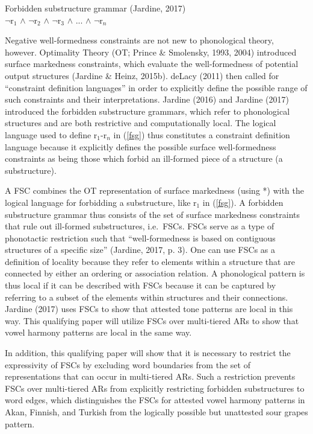 \documentclass[,doc,floatsintext]{apa6}
\theoremstyle{definition}
\theoremstyle{definition}
\theoremstyle{definition}
\theoremstyle{remark}
\begin{document}
\begin{exe}
\ex Forbidden substructure grammar (Jardine, 2017) \label{fsg} \\
$\neg$r$_1$ $\wedge$ $\neg$r$_2$ $\wedge$ $\neg$r$_3$ $\wedge$ ... $\wedge$ $\neg$r$_n$
\end{exe}

Negative well-formedness constraints are not new to phonological theory,
however. Optimality Theory (OT; Prince \& Smolensky, 1993, 2004)
introduced surface markedness constraints, which evaluate the
well-formedness of potential output structures (Jardine \& Heinz,
2015b). deLacy (2011) then called for \enquote{constraint definition
languages} in order to explicitly define the possible range of such
constraints and their interpretations. Jardine (2016) and Jardine (2017)
introduced the forbidden substructure grammars, which refer to
phonological structures and are both restrictive and computationally
local. The logical language used to define r\(_1\)-r\(_n\) in
(\ref{fsg}) thus constitutes a constraint definition language because it
explicitly defines the possible surface well-formedness constraints as
being those which forbid an ill-formed piece of a structure (a
substructure).

A FSC combines the OT representation of surface markedness (using *)
with the logical language for forbidding a substructure, like r\(_1\) in
(\ref{fsg}). A forbidden substructure grammar thus consists of the set
of surface markedness constraints that rule out ill-formed
substructures, i.e.~FSCs. FSCs serve as a type of phonotactic
restriction such that \enquote{well-formedness is based on contiguous
structures of a specific size} (Jardine, 2017, p. 3). One can use FSCs
as a definition of locality because they refer to elements within a
structure that are connected by either an ordering or association
relation. A phonological pattern is thus local if it can be described
with FSCs because it can be captured by referring to a subset of the
elements within structures and their connections. Jardine (2017) uses
FSCs to show that attested tone patterns are local in this way. This
qualifying paper will utilize FSCs over multi-tiered ARs to show that
vowel harmony patterns are local in the same way.

In addition, this qualifying paper will show that it is necessary to
restrict the expressivity of FSCs by excluding word boundaries from the
set of representations that can occur in multi-tiered ARs. Such a
restriction prevents FSCs over multi-tiered ARs from explicitly
restricting forbidden substructures to word edges, which distinguishes
the FSCs for attested vowel harmony patterns in Akan, Finnish, and
Turkish from the logically possible but unattested sour grapes pattern.
\end{document}
